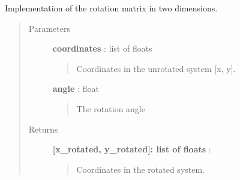 \documentclass[a4paper,10pt,english]{sphinxmanual}
\begin{document}
\begin{fulllineitems}
\label{functions:astrolyze.functions.astro_functions.rotation_2d}
Implementation of the rotation matrix in two dimensions.
\begin{quote}\begin{description}
\item[{Parameters }] \leavevmode
\textbf{coordinates} : list of floats
\begin{quote}

Coordinates in the unrotated system {[}x, y{]}.
\end{quote}

\textbf{angle} : float
\begin{quote}

The rotation angle
\end{quote}

\item[{Returns }] \leavevmode
\textbf{{[}x\_rotated, y\_rotated{]}: list of floats} :
\begin{quote}

Coordinates in the rotated system.
\end{quote}

\end{description}\end{quote}

\end{fulllineitems}

\end{document}
